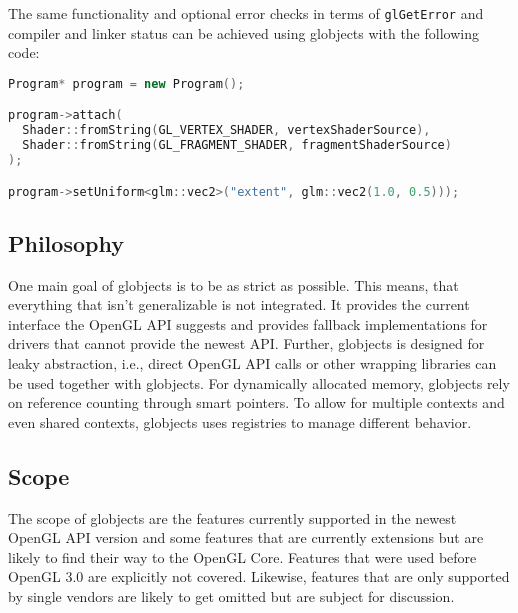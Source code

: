 \documentclass{article}
\begin{document}
\noindent The same functionality and optional error checks in terms of \lstinline|glGetError| and compiler and linker status can be achieved using globjects with the following code:
\begin{lstlisting}[language=c++,frame=single,basicstyle=\footnotesize]
Program* program = new Program();

program->attach(
  Shader::fromString(GL_VERTEX_SHADER, vertexShaderSource), 
  Shader::fromString(GL_FRAGMENT_SHADER, fragmentShaderSource)
);

program->setUniform<glm::vec2>("extent", glm::vec2(1.0, 0.5)));
\end{lstlisting}

\subsection{Philosophy}

One main goal of globjects is to be as strict as possible. This means, that everything that isn't generalizable is not integrated. It provides the current interface the OpenGL API suggests and provides fallback implementations for drivers that cannot provide the newest API. Further, globjects is designed for leaky abstraction, i.e., direct OpenGL API calls or other wrapping libraries can be used together with globjects. For dynamically allocated memory, globjects rely on reference counting through smart pointers. To allow for multiple contexts and even shared contexts, globjects uses registries to manage different behavior.

\subsection{Scope}

The scope of globjects are the features currently supported in the newest OpenGL API version and some features that are currently extensions but are likely to find their way to the OpenGL Core. Features that were used before OpenGL 3.0 are explicitly not covered. Likewise, features that are only supported by single vendors are likely to get omitted but are subject for discussion.
\end{document}
